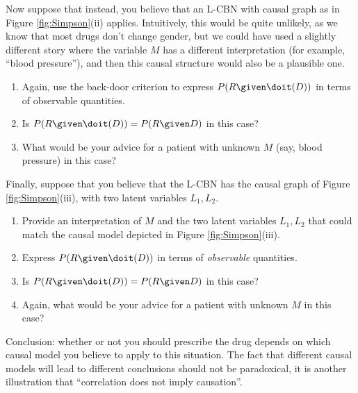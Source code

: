 \begin{enumerate}
  Now suppose that instead, you believe that an L-CBN with causal graph as in Figure \ref{fig:Simpson}(ii) applies. Intuitively, this would be quite unlikely, as we
  know that most drugs don't change gender, but we could have used a slightly different story where the variable $M$ has a different interpretation
  (for example, ``blood pressure''), and then this causal structure would also be a plausible one.

  \begin{enumerate}[resume*]
    \item Again, use the back-door criterion to express $P(R \given \doit(D))$ in terms of observable quantities.
    \item Is $P(R \given \doit(D)) = P(R \given D)$ in this case?
    \item \label{Simpson_2} What would be your advice for a patient with unknown $M$ (say, blood pressure) in this case?
  \end{enumerate}

  Finally, suppose that you believe that the L-CBN has the causal graph of Figure \ref{fig:Simpson}(iii), with two
  latent variables $L_1,L_2$.

  \begin{enumerate}[resume*]
    \item Provide an interpretation of $M$ and the two latent variables $L_1,L_2$ that could match the causal model depicted in Figure \ref{fig:Simpson}(iii).
    \item Express $P(R \given \doit(D))$ in terms of \emph{observable} quantities.
    \item Is $P(R \given \doit(D)) = P(R \given D)$ in this case?
    \item Again, what would be your advice for a patient with unknown $M$ in this case?
  \end{enumerate}

  Conclusion: whether or not you should prescribe the drug depends on which causal model you believe to apply to this situation.
  The fact that different causal models will lead to different conclusions should not be paradoxical, it is another illustration that
  ``correlation does not imply causation''.


\end{enumerate}
